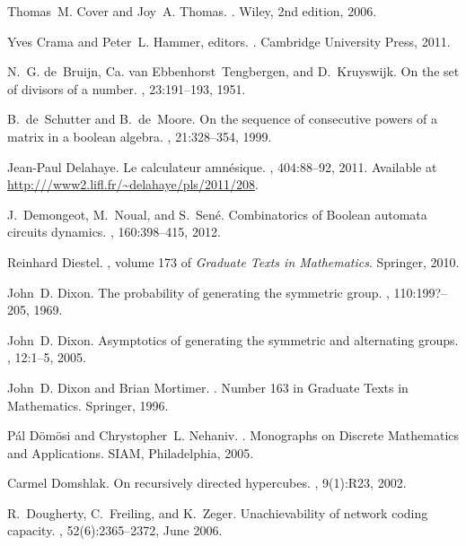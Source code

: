 \documentclass[a4paper, 11pt]{book}
\numberwithin{equation}{section}
\theoremstyle{plain}
\renewcommand{\(}{\ldbrack}
\renewcommand{\)}{\rdbrack}
\begin{document}
\begin{thebibliography}{100}
Thomas~M. Cover and Joy~A. Thomas.
.
\newblock Wiley, 2nd edition, 2006.

Yves Crama and Peter~L. Hammer, editors.
.
\newblock Cambridge University Press, 2011.

N.~G. de~Bruijn, Ca. van Ebbenhorst~Tengbergen, and D.~Kruyswijk.
\newblock On the set of divisors of a number.
, 23:191--193, 1951.

B.~de~Schutter and B.~de~Moore.
\newblock On the sequence of consecutive powers of a matrix in a boolean
  algebra.
, 21:328--354, 1999.

Jean-Paul Delahaye.
\newblock Le calculateur amn\'esique.
, 404:88--92, 2011.
\newblock Available at \url{http:///www2.lifl.fr/~delahaye/pls/2011/208}.

J.~Demongeot, M.~Noual, and S.~Sen\'e.
\newblock Combinatorics of {B}oolean automata circuits dynamics.
, 160:398--415, 2012.

Reinhard Diestel.
, volume 173 of {\em Graduate Texts in
  Mathematics}.
\newblock Springer, 2010.

John~D. Dixon.
\newblock The probability of generating the symmetric group.
, 110:199?--205, 1969.

John~D. Dixon.
\newblock Asymptotics of generating the symmetric and alternating groups.
, 12:1--5, 2005.

John~D. Dixon and Brian Mortimer.
.
\newblock Number 163 in Graduate Texts in Mathematics. Springer, 1996.

P\'al D\"{o}m\"{o}si and Chrystopher~L. Nehaniv.
.
\newblock Monographs on Discrete Mathematics and Applications. SIAM,
  Philadelphia, 2005.

Carmel Domshlak.
\newblock On recursively directed hypercubes.
, 9(1):R23, 2002.

R.~Dougherty, C.~Freiling, and K.~Zeger.
\newblock Unachievability of network coding capacity.
, 52(6):2365--2372, June
  2006.


\end{thebibliography}
\end{document}
